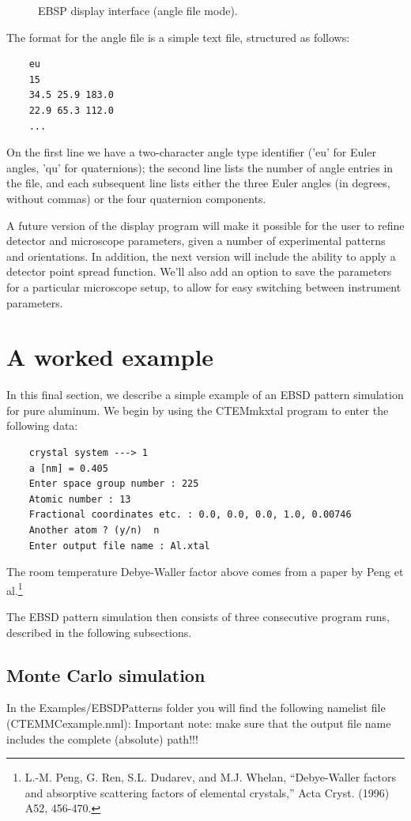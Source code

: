 \documentclass[DIV=calc, paper=letter, fontsize=11pt]{scrartcl}	 %
\begin{document}
\begin{figure}[t]
\leavevmode\centering
\epsfxsize=3in
\caption{\label{fig:EBSP2}EBSP display interface (angle file mode).}
\end{figure}

The format for the angle file is a simple text file, structured as follows:
\begin{verbatim}
	eu
	15
	34.5 25.9 183.0
	22.9 65.3 112.0
	...
\end{verbatim}
On the first line we have a two-character angle type identifier ('eu' for Euler angles, 'qu' for quaternions); the second line 
lists the number of angle entries in the file, and each subsequent line lists either the three Euler angles (in degrees, without commas)
or the four quaternion components.

A future version of the display program will make it possible for the user to refine detector and microscope parameters, given a number of experimental
patterns and orientations.  In addition, the next version will include the ability to apply a detector point spread function.  We'll also add
an option to save the parameters for a particular microscope setup, to allow for easy switching between instrument parameters.


\section{A worked example\label{sec:examples}}
In this final section, we describe a simple example of an EBSD pattern simulation for pure aluminum.  We begin by using the 
\textsf{CTEMmkxtal} program to enter the following data:
\begin{verbatim}
	crystal system ---> 1
	a [nm] = 0.405
	Enter space group number : 225
	Atomic number : 13
	Fractional coordinates etc. : 0.0, 0.0, 0.0, 1.0, 0.00746
	Another atom ? (y/n)  n
	Enter output file name : Al.xtal
\end{verbatim}
The room temperature Debye-Waller factor above comes from a paper by Peng et al.\footnote{L.-M. Peng, G. Ren, S.L. Dudarev, and M.J. Whelan,
``Debye-Waller factors and absorptive scattering factors of elemental crystals,'' Acta Cryst. (1996) A52, 456-470.}

The EBSD pattern simulation then consists of three consecutive program runs, described in the following subsections.

\subsection{Monte Carlo simulation}
In the \textsf{Examples/EBSDPatterns} folder you will find the following namelist file (CTEMMCexample.nml):
Important note: make sure that the output file name includes the complete (absolute) path!!!
 
\end{document}
